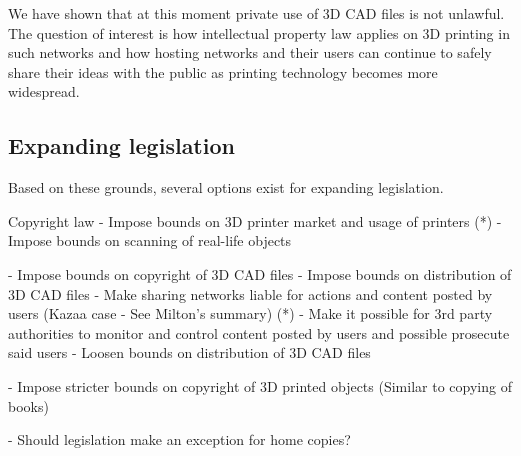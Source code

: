 We have shown that at this moment private use of 3D CAD files is not unlawful.
The question of interest is how intellectual property law applies on 3D printing in such networks and how hosting networks and their users can continue to safely share their ideas with the public as printing technology becomes more widespread.

\subsection{Expanding legislation}
Based on these grounds, several options exist for expanding legislation.

Copyright law
- Impose bounds on 3D printer market and usage of printers (*)
- Impose bounds on scanning of real-life objects

- Impose bounds on copyright of 3D CAD files 
- Impose bounds on distribution of 3D CAD files
	- Make sharing networks liable for actions and content posted by users (Kazaa case - See Milton’s summary) (*)
	- Make it possible for 3rd party authorities to monitor and control content posted by users and possible prosecute said users
- Loosen bounds on distribution of 3D CAD files

- Impose stricter bounds on copyright of 3D printed objects (Similar to copying of books)

- Should legislation make an exception for home copies?
